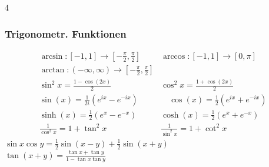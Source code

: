 \documentclass[6pt,a4paper]{scrartcl}
\newcommand{\enbrace}[1]{\ensuremath{\left(#1\right)}}
\begin{document}
\begin{multicols*}{4}
	\begin{sectionbox}
		\subsubsection{Trigonometr. Funktionen}
		\begin{eqnarray*}
			\arcsin: [-1,1] \rightarrow [-\frac{\pi}{2},\frac{\pi}{2}] & \arccos: [-1,1] \rightarrow [0,\pi] \\
			\arctan: (-\infty, \infty) \rightarrow [-\frac{\pi}{2},\frac{\pi}{2}] \\
			\sin^2 x = \frac{1 - \cos(2x)}{2} &\cos^2 x=\frac{1 + \cos(2x)}{2} \\
			\sin(x)=\frac{1}{2i}\enbrace{e^{ix}-e^{-ix}} \quad & \quad \cos(x)=\frac{1}{2}\enbrace{e^{ix}+e^{-ix}} \\
			\sinh(x)=\frac{1}{2}(e^x-e^{-x}) & \cosh(x)=\frac{1}{2}(e^x+e^{-x}) \\
			\frac{1}{\cos^2 x}=1+\tan^2x & \frac{1}{\sin^2 x}=1+\cot^2x
		\end{eqnarray*}
		$\sin x \cos y = \frac{1}{2}\sin(x-y)+\frac{1}{2}\sin(x+y)$\\
		$\tan(x+y)=\frac{\tan x + \tan y}{1 - \tan x \tan y}$\\


\end{sectionbox}
\end{multicols*}
\end{document}
